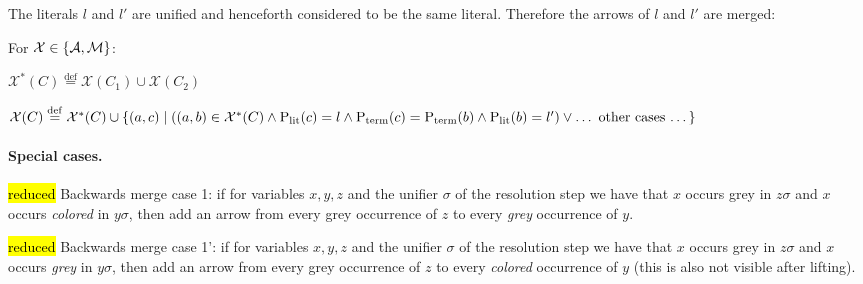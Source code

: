 \documentclass[,%
	paper=a4,%
	DIV12, %
	twoside=false,%
	liststotoc,
	bibtotoc,
	draft=false,%
	numbers=noendperiod
]{scrartcl}
\begin{document}
\begin{enumerate}
		The literals $l$ and $l'$ are unified and henceforth considered to be the same literal.
		Therefore the arrows of $l$ and $l'$ are merged:

		For $\mathcal{X} \in \{\operatorname{\mathcal{A}}, \operatorname{\operatorname{\mathcal{M}}}\}$:

		$\mathcal{X}^*(C) \stackrel{\operatorname{def}}{=} \mathcal{X}(C_1) \cup \mathcal{X}(C_2)$

		$\mathcal{X}(C) \stackrel{\operatorname{def}}{=} \mathcal{X}^*(C) \cup \{(a,c) \mid ((a,b)\in\mathcal{X}^*(C) \land \operatorname{\operatorname{{\operatorname P}}_\mathrm{lit}}(c) = l \land \operatorname{\operatorname{{\operatorname P}}_\mathrm{term}}(c) = \operatorname{\operatorname{{\operatorname P}}_\mathrm{term}}(b) \land \operatorname{\operatorname{{\operatorname P}}_\mathrm{lit}}(b) = l') \lor \text{\dots~other cases \dots}\}$


	\paragraph{Special cases.}



		\hl{reduced} Backwards merge case 1: if for variables $x,y,z$
		and the unifier $\sigma$ of the resolution step we have that $x$ occurs grey in $z\sigma$ and $x$ occurs \emph{colored} in $y\sigma$, then add an arrow from every grey occurrence of $z$ to every \emph{grey} occurrence of $y$.

		\hl{reduced} Backwards merge case 1': if for variables $x,y,z$
		and the unifier $\sigma$ of the resolution step we have that $x$ occurs grey in $z\sigma$ and $x$ occurs \emph{grey} in $y\sigma$, then add an arrow from every grey occurrence of $z$ to every \emph{colored} occurrence of $y$ (this is also not visible after lifting).


\end{enumerate}
\end{document}
